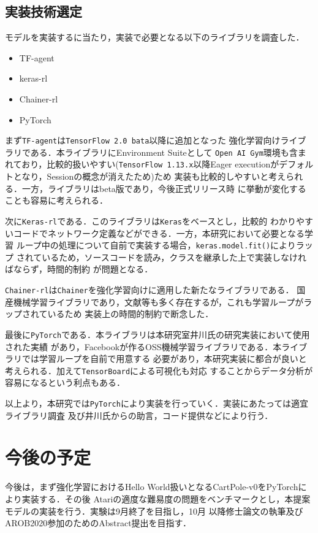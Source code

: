 \documentclass[11pt,a4paper]{jsarticle}
\begin{document}
\subsection{実装技術選定}
モデルを実装するに当たり，実装で必要となる以下のライブラリを調査した．
\begin{itemize}
  \item TF-agent
  \item keras-rl
  \item Chainer-rl
  \item PyTorch
\end{itemize}
まず\texttt{TF-agent}は\texttt{TensorFlow 2.0 bata}以降に追加となった
強化学習向けライブラリである．本ライブラリにEnvironment Suiteとして
\texttt{Open AI Gym}環境も含まれており，比較的扱いやすい(\texttt{TensorFlow
 1.13.x}以降Eager executionがデフォルトとなり，Sessionの概念が消えたため)ため
実装も比較的しやすいと考えられる．一方，ライブラリはbeta版であり，今後正式リリース時
に挙動が変化することも容易に考えられる．\par
次に\texttt{Keras-rl}である．このライブラリは\texttt{Keras}をベースとし，比較的
わかりやすいコードでネットワーク定義などができる．一方，本研究において必要となる学習
ループ中の処理について自前で実装する場合，\texttt{keras.model.fit()}によりラップ
されているため，ソースコードを読み，クラスを継承した上で実装しなければならず，時間的制約
が問題となる．\par
\texttt{Chainer-rl}は\texttt{Chainer}を強化学習向けに適用した新たなライブラリである．
国産機械学習ライブラリであり，文献等も多く存在するが，これも学習ループがラップされているため
実装上の時間的制約で断念した．\par
最後に\texttt{PyTorch}である．本ライブラリは本研究室井川氏の研究実装において使用された実績
があり，Facebookが作るOSS機械学習ライブラリである．本ライブラリでは学習ループを自前で用意する
必要があり，本研究実装に都合が良いと考えられる．加えて\texttt{TensorBoard}による可視化も対応
することからデータ分析が容易になるという利点もある．\par
以上より，本研究では\texttt{PyTorch}により実装を行っていく．実装にあたっては適宜ライブラリ調査
及び井川氏からの助言，コード提供などにより行う．

\section{今後の予定}
今後は，まず強化学習におけるHello World扱いとなるCartPole-v0をPyTorchにより実装する．その後
Atariの適度な難易度の問題をベンチマークとし，本提案モデルの実装を行う．実験は9月終了を目指し，10月
以降修士論文の執筆及びAROB2020参加のためのAbstract提出を目指す．
\end{document}
